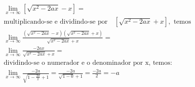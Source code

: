 \begin{ex}
\begin{align}
&\lim_{x\rightarrow \infty} [\sqrt{x^2-2ax}-x]=\nonumber\\
&\text{multiplicando-se e dividindo-se por}\quad{[\sqrt{x^2-2ax}+x],}\text{ temos }\nonumber\\
&\lim_{x\rightarrow \infty} \frac{(\sqrt{x^2-2ax}-x)(\sqrt{x^2-2ax}+x)}{\sqrt{x^2-2ax}+x}=\nonumber\\
&\lim_{x\rightarrow \infty} \frac{-2ax}{\sqrt{x^2-2ax}+x}=\nonumber\\
&\text{dividindo-se o numerador e o denominador por x, temos:}\nonumber\\
&\lim_{x\rightarrow \infty} \frac{-2a}{\sqrt{1-\frac{2a}{x}}+1}=\frac{-2a}{\sqrt{1-0}+1}=\frac{-2a}{2}=-a\nonumber
\end{align}
\end{ex}